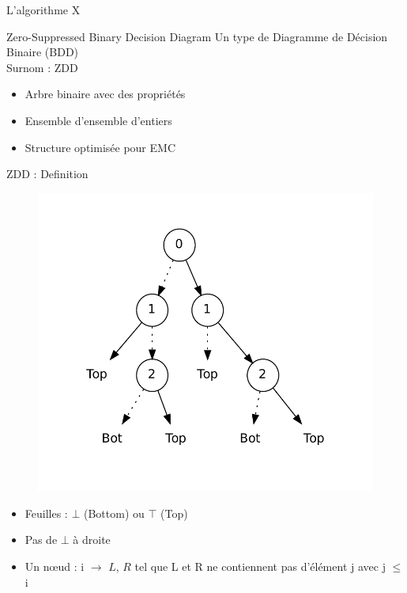 \documentclass{beamer}
\begin{document}
\begin{frame}{L'algorithme X}
\scalebox{0.6}{

}
\end{frame}



\begin{frame}{Zero-Suppressed Binary Decision Diagram}
Un type de Diagramme de Décision Binaire (BDD)\\
Surnom : ZDD
\begin{itemize}
\item Arbre binaire avec des propriétés
\item Ensemble d'ensemble d'entiers
\item Structure optimisée pour EMC
\end{itemize}
\end{frame}

\begin{frame}{ZDD : Definition}
\begin{figure}[htp]
\begin{center}
\includegraphics[scale=0.3]{../imports/zdd_ex.pdf}
\end{center}
\end{figure}
\begin{itemize}
\item Feuilles : $\bot$ (Bottom) ou $\top$ (Top)
\item Pas de $\bot$ à droite
\item Un n\oe ud : i $\rightarrow$ $L$, $R$ tel
que L et R ne contiennent pas d'élément j avec j $\leq$ i \\
\end{itemize} 
\end{frame}
\end{document}
